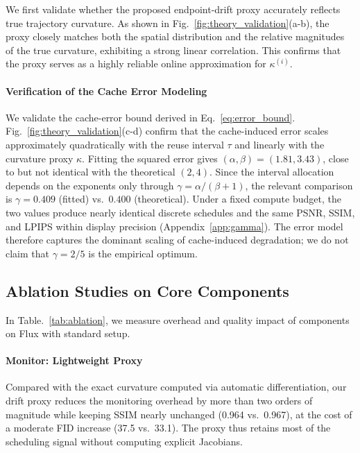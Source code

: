 We first validate whether the proposed endpoint-drift proxy accurately reflects true trajectory curvature. As shown in Fig.~\ref{fig:theory_validation}(a-b), the proxy closely matches both the spatial distribution and the relative magnitudes of the true curvature, exhibiting a strong linear correlation. This confirms that the proxy serves as a highly reliable online approximation for $\kappa^{(i)}$.

\vspace{-7pt}
\paragraph{Verification of the Cache Error Modeling}
We validate the cache-error bound derived in Eq.~\ref{eq:error_bound}. Fig.~\ref{fig:theory_validation}(c-d) confirm that the cache-induced error scales approximately quadratically with the reuse interval $\tau$ and linearly with the curvature proxy $\kappa$. Fitting the squared error gives $(\alpha,\beta)=(1.81, 3.43)$, close to but not identical with the theoretical $(2,4)$. Since the interval allocation depends on the exponents only through $\gamma=\alpha/(\beta+1)$, the relevant comparison is $\gamma=0.409$ (fitted) vs.\ $0.400$ (theoretical). Under a fixed compute budget, the two values produce nearly identical discrete schedules and the same PSNR, SSIM, and LPIPS within display precision (Appendix~\ref{app:gamma}). The error model therefore captures the dominant scaling of cache-induced degradation; we do not claim that $\gamma=2/5$ is the empirical optimum.

\vspace{-7pt}
\subsection{Ablation Studies on Core Components}

In Table.~\ref{tab:ablation}, we measure overhead and quality impact of \cubic components on Flux with standard setup.



\vspace{-7pt}
\paragraph{Monitor: Lightweight Proxy}
Compared with the exact curvature computed via automatic differentiation, our drift proxy reduces the monitoring overhead by more than two orders of magnitude while keeping SSIM nearly unchanged (0.964 vs.\ 0.967), at the cost of a moderate FID increase (37.5 vs.\ 33.1). The proxy thus retains most of the scheduling signal without computing explicit Jacobians.

